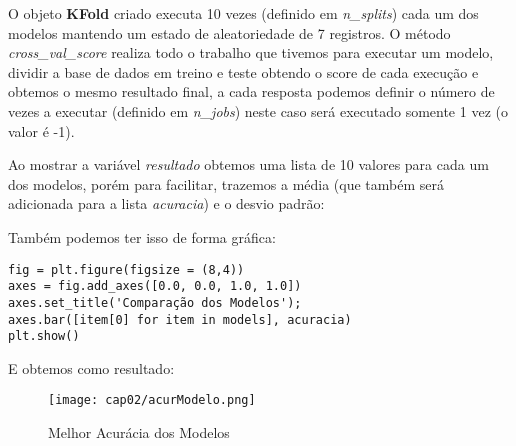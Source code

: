 O objeto \textbf{KFold} criado executa 10 vezes (definido em \textit{n\_splits}) cada um dos modelos mantendo um estado de aleatoriedade de 7 registros. O método \textit{cross\_val\_score} realiza todo o trabalho que tivemos para executar um modelo, dividir a base de dados em treino e teste obtendo o score de cada execução e obtemos o mesmo resultado final, a cada resposta podemos definir o número de vezes a executar (definido em \textit{n\_jobs}) neste caso será executado somente 1 vez (o valor é -1).

Ao mostrar a variável \textit{resultado} obtemos uma lista de 10 valores para cada um dos modelos, porém para facilitar, trazemos a média (que também será adicionada para a lista \textit{acuracia}) e o desvio padrão: \\

Também podemos ter isso de forma gráfica:
\begin{lstlisting}
fig = plt.figure(figsize = (8,4))
axes = fig.add_axes([0.0, 0.0, 1.0, 1.0])
axes.set_title('Comparação dos Modelos');
axes.bar([item[0] for item in models], acuracia)
plt.show()
\end{lstlisting}

E obtemos como resultado:
\begin{figure}[H]
	\centering
	\texttt{[image: cap02/acurModelo.png]}
	\caption{Melhor Acurácia dos Modelos}
\end{figure}

